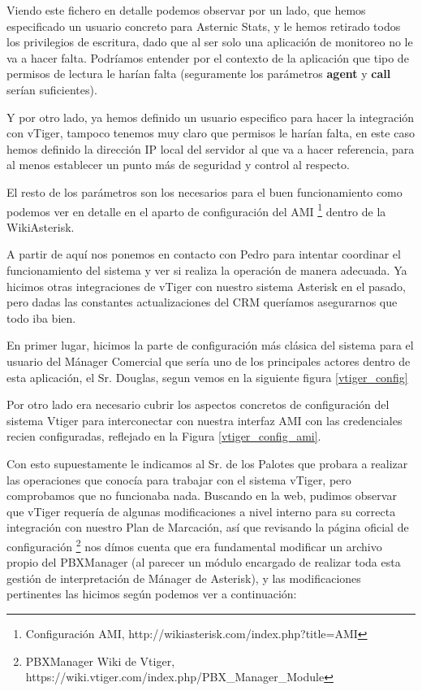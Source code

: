 

Viendo este fichero en detalle podemos observar por un lado, que hemos especificado un usuario concreto para Asternic Stats, y le hemos retirado todos los privilegios de escritura, dado que al ser solo una aplicación de monitoreo no le va a hacer falta. Podríamos entender por el contexto de la aplicación que tipo de permisos de lectura le harían falta (seguramente los parámetros \textbf{agent} y \textbf{call} serían suficientes).

Y por otro lado, ya hemos definido un usuario especifico para hacer la integración con vTiger, tampoco tenemos muy claro que permisos le harían falta, en este caso hemos definido la dirección IP local del servidor al que va a hacer referencia, para al menos establecer un punto más de seguridad y control al respecto.

El resto de los parámetros son los necesarios para el buen funcionamiento como podemos ver en detalle en el aparto de configuración del AMI \footnote{Configuración AMI, http://wikiasterisk.com/index.php?title=AMI} dentro de la WikiAsterisk.

A partir de aquí nos ponemos en contacto con Pedro para intentar coordinar el funcionamiento del sistema y ver si realiza la operación de manera adecuada. Ya hicimos otras integraciones de vTiger con nuestro sistema Asterisk en el pasado, pero dadas las constantes actualizaciones del CRM queríamos asegurarnos que todo iba bien.

En primer lugar, hicimos la parte de configuración más clásica del sistema para el usuario del Mánager Comercial que sería uno de los principales actores dentro de esta aplicación, el Sr. Douglas, segun vemos en la siguiente figura \ref{vtiger_config}


Por otro lado era necesario cubrir los aspectos concretos de configuración del sistema Vtiger para interconectar con nuestra interfaz AMI con las credenciales recien configuradas, reflejado en la Figura \ref{vtiger_config_ami}.


Con esto supuestamente le indicamos al Sr. de los Palotes que probara a realizar las operaciones que conocía para trabajar con el sistema vTiger, pero comprobamos que no funcionaba nada. Buscando en la web, pudimos observar que vTiger requería de algunas modificaciones a nivel interno para su correcta integración con nuestro Plan de Marcación, así que revisando la página oficial de configuración \footnote{PBXManager Wiki de Vtiger, https://wiki.vtiger.com/index.php/PBX\_Manager\_Module} nos dímos cuenta que era fundamental modificar un archivo propio del PBXManager (al parecer un módulo encargado de realizar toda esta gestión de interpretación de Mánager de Asterisk), y las modificaciones pertinentes las hicimos según podemos ver a continuación:

